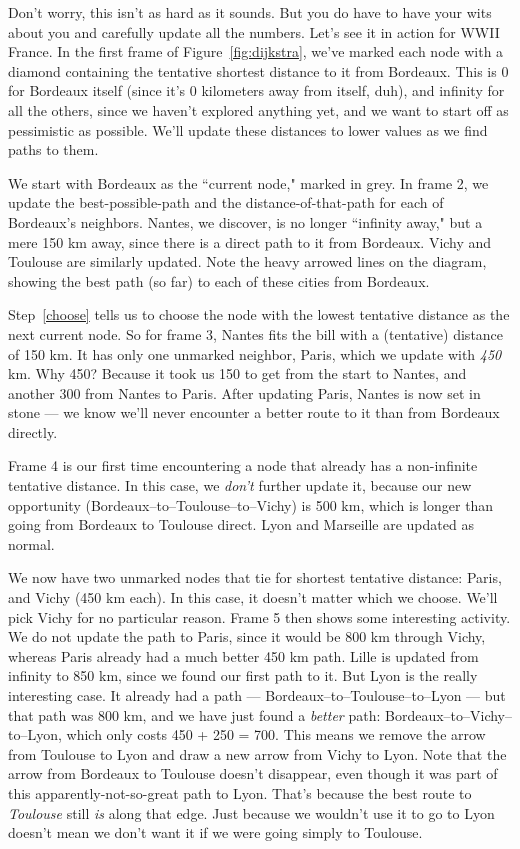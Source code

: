 Don't worry, this isn't as hard as it sounds. But you do have to have your
wits about you and carefully update all the numbers. Let's see it in action
for WWII France. In the first frame of Figure~\ref{fig:dijkstra}, we've marked
each node with a diamond containing the tentative shortest distance to it
from Bordeaux. This is 0 for Bordeaux itself (since it's 0 kilometers away
from itself, duh), and infinity for all the others, since we haven't
explored anything yet, and we want to start off as pessimistic as possible.
We'll update these distances to lower values as we find paths to them.

We start with Bordeaux as the ``current node," marked in grey. In frame 2,
we update the best-possible-path and the distance-of-that-path for each of
Bordeaux's neighbors. Nantes, we discover, is no longer ``infinity away,"
but a mere 150 km away, since there is a direct path to it from Bordeaux.
Vichy and Toulouse are similarly updated. Note the heavy arrowed lines on
the diagram, showing the best path (so far) to each of these cities from
Bordeaux. 

Step~\ref{choose} tells us to choose the node with the lowest tentative
distance as the next current node. So for frame 3, Nantes fits the bill
with a (tentative) distance of 150 km. It has only one unmarked neighbor,
Paris, which we update with \textit{450} km. Why 450? Because it took us
150 to get from the start to Nantes, and another 300 from Nantes to Paris.
After updating Paris, Nantes is now set in stone --- we know we'll never
encounter a better route to it than from Bordeaux directly.

Frame 4 is our first time encountering a node that already has a
non-infinite tentative distance. In this case, we \textit{don't} further
update it, because our new opportunity (Bordeaux--to--Toulouse--to--Vichy)
is 500 km, which is longer than going from Bordeaux to Toulouse direct.
Lyon and Marseille are updated as normal.

We now have two unmarked nodes that tie for shortest tentative distance:
Paris, and Vichy (450 km each). In this case, it doesn't matter which we
choose. We'll pick Vichy for no particular reason. Frame 5 then shows some
interesting activity. We do not update the path to Paris, since it would be
800 km through Vichy, whereas Paris already had a much better 450 km path.
Lille is updated from infinity to 850 km, since we found our first path to
it. But Lyon is the really interesting case. It already had a path ---
Bordeaux--to--Toulouse--to--Lyon --- but that path was 800 km, and we have
just found a \textit{better} path: Bordeaux--to--Vichy--to--Lyon, which
only costs 450 + 250 = 700. This means we remove the arrow from Toulouse to
Lyon and draw a new arrow from Vichy to Lyon. Note that the arrow from
Bordeaux to Toulouse doesn't disappear, even though it was part of this
apparently-not-so-great path to Lyon. That's because the best route to
\textit{Toulouse} still \textit{is} along that edge. Just because we
wouldn't use it to go to Lyon doesn't mean we don't want it if we were
going simply to Toulouse.

